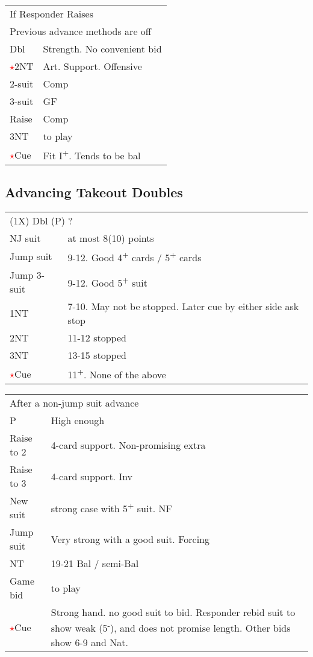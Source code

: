 \documentclass{article}
\newcommand{\nt}{\relsize{-1}NT\relsize{1}}
\newcommand{\up}{\textsuperscript{+}}
\newcommand{\down}{\textsuperscript{-}}
\newcommand{\al}{\textcolor{red}{$\star$}}
\begin{document}
\medskip

\begin{tabular}{|l|p{6.5cm}}
	\multicolumn{2}{l}{If Responder Raises} \\
	\multicolumn{2}{l}{Previous advance methods are off} \\
	Dbl & Strength. No convenient bid \\
	\al{}2\nt{} & Art. Support. Offensive \\
	2-suit & Comp \\
	3-suit & GF \\
	Raise & Comp \\
	3\nt{} & to play \\
	\al{}Cue & Fit I\up{}. Tends to be bal \\
\end{tabular}

\subsection{Advancing Takeout Doubles}
\begin{tabular}{|l|p{6.5cm}}
	\multicolumn{2}{l}{(1X) Dbl (P) ?} \\
  NJ suit & at most 8(10) points \\
	Jump suit & 9-12. Good 4\up{} cards / 5\up{} cards \\
	Jump 3-suit & 9-12. Good 5\up{} suit \\
	1\nt{} & 7-10. May not be stopped. Later cue by either side ask stop \\
	2\nt{} & 11-12 stopped \\
	3\nt{} & 13-15 stopped \\
	\al{}Cue & 11\up{}. None of the above \\
\end{tabular}

\medskip

\begin{tabular}{|l|p{6.5cm}}
	\multicolumn{2}{l}{After a non-jump suit advance} \\
  P & High enough \\
	Raise to 2 & 4-card support. Non-promising extra \\
	Raise to 3 & 4-card support. Inv \\
	New suit & strong case with 5\up{} suit. NF \\
	Jump suit & Very strong with a good suit. Forcing \\
	\nt{} & 19-21 Bal / semi-Bal \\
	Game bid & to play \\
	\al{}Cue & Strong hand. no good suit to bid. Responder rebid suit to show weak (5\down{}), and does not promise length. Other bids show 6-9 and Nat. \\
\end{tabular}
\end{document}
